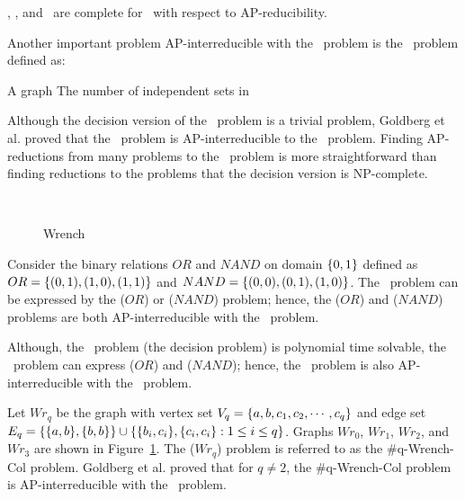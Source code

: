 \begin{cor}
\csat, \ctsat, and \ctcol\ are complete for \cp\ with respect to AP-reducibility.
\end{cor}

Another important problem AP-interreducible with the \csat\ problem is the \cis\ problem defined as:

\pnndef%
{A graph \mG}
{The number of independent sets in \mG}

Although the decision version of the \cis\ problem is a trivial problem, Goldberg et al.
\cite{Leslie03} proved that the \cis\ problem is AP-interreducible to the \csat\ problem. 
Finding AP-reductions from many problems to the \cis\ problem is more straightforward than
finding reductions to the problems that the decision version is NP-complete.

\begin{figure}[h]
\subfigure[\(Wr_0\)]{\label{fig:Wr0}}\hspace{4.78cm}
\subfigure[\(Wr_1\)]{\label{fig:Wr1}}\\
\subfigure[\(Wr_2\)]{\label{fig:Wr2}}\hfill
\subfigure[\(Wr_3\)]{\label{fig:Wr3}}
\caption{Wrench}
\label{fig:wrench}
\end{figure}

\begin{example}
Consider the binary relations \(OR\) and \(NAND\) on domain \(\{{{0,1}}\}\) defined as
\(OR=\{{(0,1),(1,0),(1,1)}\}\) and \(NAND=\{{(0,0),(0,1),(1,0)}\}\)\@.
The \cis\ problem can be expressed by the \ccsp(\(OR\)) or \ccsp(\(NAND\)) problem;
hence, the \ccsp(\(OR\)) and \ccsp(\(NAND\)) problems are both AP-interreducible with the
\csat\ problem.

Although, the \dsat\ problem (the decision problem) is polynomial time
solvable, the \cdsat\ problem can express \ccsp(\(OR\)) and
\ccsp(\(NAND\)); hence, the \cdsat\ problem 
is also AP-interreducible with the \csat\ problem.
\end{example}

\begin{example} \label{exm:wrench}
Let \(Wr_q\) be the graph with vertex set \(V_q=\{{a,b,c_1,c_2,\cdots,c_q}\}\)
and edge set \(E_q=\{{\{{a,b}\},\{{b,b}\}}\} \cup 
\{{\{{b_i,c_i}\},\{{c_i,c_i}\}:1\le i\le q}\}\)\@.
Graphs \(Wr_0\), \(Wr_1\), \(Wr_2\), and \(Wr_3\) are shown in Figure~\ref{fig:wrench}.
The \chom(\(Wr_q\)) problem is referred to as the \#q-{\sc Wrench-Col} problem. 
Goldberg et al. \cite{Leslie03} proved that for \(q\neq 2\), the  \#q-{\sc Wrench-Col} problem
is AP-interreducible with the \csat\ problem.
\end{example}

